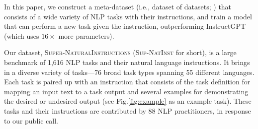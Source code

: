 In this paper, we construct a meta-dataset (i.e., dataset of datasets; \citealp{triantafillou2019meta}) that consists of a wide variety of NLP tasks with their instructions, and train a model that can perform a new task given the instruction, outperforming InstructGPT (which uses $16\times$ more parameters).

Our dataset, \textsc{Super-NaturalInstructions} (\textsc{Sup-NatInst} for short), is a large benchmark of 1,616 NLP tasks and their natural language instructions. It brings in a diverse variety of tasks---76 broad task types spanning 55 different languages. Each task is paired up with an instruction that consists of the task definition for mapping an input text to a task output and several examples for demonstrating the desired or undesired output (see Fig.\ref{fig:example} as an example task). These tasks and their instructions are contributed by 88 NLP practitioners, in response to our public call.

